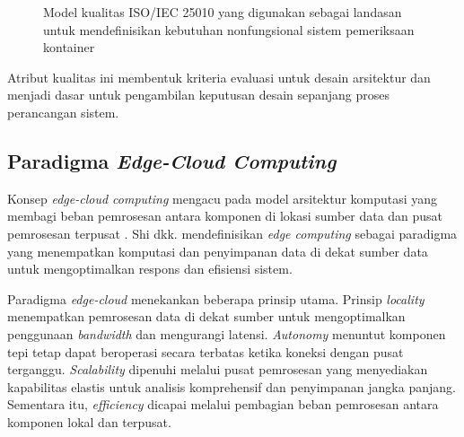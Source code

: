 \begin{figure}[htbp]
{}
  \caption{Model kualitas ISO/IEC 25010 yang digunakan sebagai landasan untuk mendefinisikan kebutuhan nonfungsional sistem pemeriksaan kontainer}
  \label{fig:iso25010_quality_model}
\end{figure}
\FloatBarrier

Atribut kualitas ini membentuk kriteria evaluasi untuk desain
arsitektur dan menjadi dasar untuk pengambilan keputusan desain sepanjang
proses perancangan sistem.

\subsection{Paradigma \textit{Edge-Cloud Computing}}

Konsep \textit{edge-cloud computing} mengacu pada model arsitektur komputasi yang membagi beban pemrosesan antara komponen di lokasi sumber data dan pusat pemrosesan terpusat \autocite{shi2016}. Shi dkk. mendefinisikan \textit{edge computing} sebagai paradigma yang menempatkan komputasi dan penyimpanan data di dekat sumber data untuk mengoptimalkan respons dan efisiensi sistem.

Paradigma \textit{edge-cloud} menekankan beberapa prinsip utama. Prinsip
\textit{locality} menempatkan pemrosesan data di dekat sumber untuk
mengoptimalkan penggunaan \textit{bandwidth} dan mengurangi latensi.
\textit{Autonomy} menuntut komponen tepi tetap dapat beroperasi secara
terbatas ketika koneksi dengan pusat terganggu. \textit{Scalability}
dipenuhi melalui pusat pemrosesan yang menyediakan kapabilitas elastis untuk
analisis komprehensif dan penyimpanan jangka panjang. Sementara itu,
\textit{efficiency} dicapai melalui pembagian beban pemrosesan antara
komponen lokal dan terpusat.

